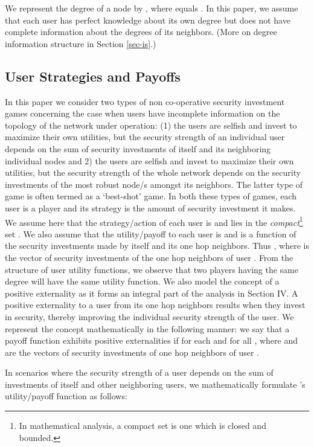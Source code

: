 \documentclass[letterpaper,12pt,onecolumn, nodraft]{IEEEtran}
\begin{document}
We represent the degree of a node  by , where  equals . In this paper, we assume that each user has perfect knowledge about its own degree but does not have complete information about the degrees of its neighbors. (More on degree information structure in Section \ref{sec-is}.)

\subsection{User Strategies and Payoffs} \label{sec-payoff}
In this paper we consider two types of non co-operative security investment games concerning the case when users have incomplete information on the topology of the network under operation: (1) the users are selfish and invest to maximize their own utilities, but the security strength of an individual user depends on the sum of security investments of itself and its neighboring individual nodes and 2) the users are selfish and invest to maximize their own utilities, but the security strength of the whole network depends on the security investments of the most robust node/s amongst its neighbors. The latter type of game is often termed as a `best-shot' game. In both these types of games, each user is a player and its strategy is the amount of security investment it makes. We assume here that the strategy/action of each user  is  and lies in the \emph{compact}\footnote{In mathematical analysis, a compact set is one which is closed and bounded.} set . We also assume that the utility/payoff to each user  is  and is a function of the security investments made by itself and its one hop neighbors. Thus , where  is the vector of security investments of the one hop neighbors of user . From the structure of user utility functions, we observe that two players having the same degree will have the same utility function.  We also model the concept of a positive externality as it forms an integral part of the analysis in Section IV. A positive externality to a user from its one hop neighbors results when they invest in security, thereby improving the individual security strength of the user. We represent the concept mathematically in the following manner: we say that a payoff function exhibits positive externalities if for each  and for all , where  and  are the vectors of security investments of one hop neighbors of user .

In scenarios where the security strength of a user  depends on the sum of investments of itself and other neighboring users, we mathematically formulate 's utility/payoff function as follows:
\end{document}
